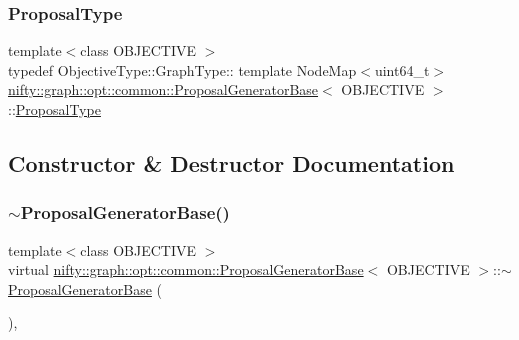 \subsubsection{\texorpdfstring{Proposal\+Type}{ProposalType}}
{\footnotesize\ttfamily template$<$class O\+B\+J\+E\+C\+T\+I\+VE $>$ \\
typedef Objective\+Type\+::\+Graph\+Type\+:: template Node\+Map$<$uint64\+\_\+t$>$ \hyperlink{classnifty_1_1graph_1_1opt_1_1common_1_1ProposalGeneratorBase}{nifty\+::graph\+::opt\+::common\+::\+Proposal\+Generator\+Base}$<$ O\+B\+J\+E\+C\+T\+I\+VE $>$\+::\hyperlink{classnifty_1_1graph_1_1opt_1_1common_1_1ProposalGeneratorBase_a122993da5c326628cdb865a6279d20c5}{Proposal\+Type}}



\subsection{Constructor \& Destructor Documentation}
\mbox{\label{classnifty_1_1graph_1_1opt_1_1common_1_1ProposalGeneratorBase_ac3cf261170f3fb5beb3ecfc483e3fb48}} 
\subsubsection{\texorpdfstring{$\sim$\+Proposal\+Generator\+Base()}{~ProposalGeneratorBase()}}
{\footnotesize\ttfamily template$<$class O\+B\+J\+E\+C\+T\+I\+VE $>$ \\
virtual \hyperlink{classnifty_1_1graph_1_1opt_1_1common_1_1ProposalGeneratorBase}{nifty\+::graph\+::opt\+::common\+::\+Proposal\+Generator\+Base}$<$ O\+B\+J\+E\+C\+T\+I\+VE $>$\+::$\sim$\hyperlink{classnifty_1_1graph_1_1opt_1_1common_1_1ProposalGeneratorBase}{Proposal\+Generator\+Base} (\begin{DoxyParamCaption}{ }\end{DoxyParamCaption})\hspace{0.3cm}{\ttfamily [inline]}, {\ttfamily [virtual]}}



